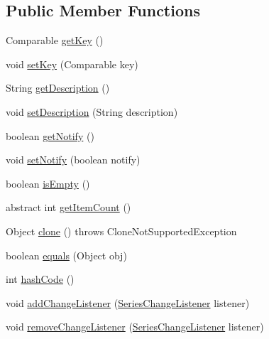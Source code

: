 \subsection*{Public Member Functions}
\begin{DoxyCompactItemize}
\item 
Comparable \mbox{\hyperlink{classorg_1_1jfree_1_1data_1_1general_1_1_series_a3cc77859046ad99ea9f01aea606f8165}{get\+Key}} ()
\item 
void \mbox{\hyperlink{classorg_1_1jfree_1_1data_1_1general_1_1_series_a9d5a4915a30d62fc59dbfc351efdf24e}{set\+Key}} (Comparable key)
\item 
String \mbox{\hyperlink{classorg_1_1jfree_1_1data_1_1general_1_1_series_a903888e10e128bb6e7d139110c0e6619}{get\+Description}} ()
\item 
void \mbox{\hyperlink{classorg_1_1jfree_1_1data_1_1general_1_1_series_af5fefb218fda90ab6a957141e7b7e2e3}{set\+Description}} (String description)
\item 
boolean \mbox{\hyperlink{classorg_1_1jfree_1_1data_1_1general_1_1_series_a9a5482d882214bd5a1be9690b77fbd39}{get\+Notify}} ()
\item 
void \mbox{\hyperlink{classorg_1_1jfree_1_1data_1_1general_1_1_series_a3d1c8936672fc710b1ae7c56751230b6}{set\+Notify}} (boolean notify)
\item 
boolean \mbox{\hyperlink{classorg_1_1jfree_1_1data_1_1general_1_1_series_aa9ff89ce98672029f036d2063b56704c}{is\+Empty}} ()
\item 
abstract int \mbox{\hyperlink{classorg_1_1jfree_1_1data_1_1general_1_1_series_a702b874ef23df4e06eeda075fd432594}{get\+Item\+Count}} ()
\item 
Object \mbox{\hyperlink{classorg_1_1jfree_1_1data_1_1general_1_1_series_a8e7f39a9bb93cfd3b3ea180dccab1f35}{clone}} ()  throws Clone\+Not\+Supported\+Exception 
\item 
boolean \mbox{\hyperlink{classorg_1_1jfree_1_1data_1_1general_1_1_series_a38ea4fb648966bd788681aee965b3311}{equals}} (Object obj)
\item 
int \mbox{\hyperlink{classorg_1_1jfree_1_1data_1_1general_1_1_series_a2e3ec0d224f21617a941872143d83bd3}{hash\+Code}} ()
\item 
void \mbox{\hyperlink{classorg_1_1jfree_1_1data_1_1general_1_1_series_a904ebb4fe8d0dacca7ec8c9a2f272a75}{add\+Change\+Listener}} (\mbox{\hyperlink{interfaceorg_1_1jfree_1_1data_1_1general_1_1_series_change_listener}{Series\+Change\+Listener}} listener)
\item 
void \mbox{\hyperlink{classorg_1_1jfree_1_1data_1_1general_1_1_series_ac3a253a273213a76b06f6a3b632457bb}{remove\+Change\+Listener}} (\mbox{\hyperlink{interfaceorg_1_1jfree_1_1data_1_1general_1_1_series_change_listener}{Series\+Change\+Listener}} listener)

\end{DoxyCompactItemize}
